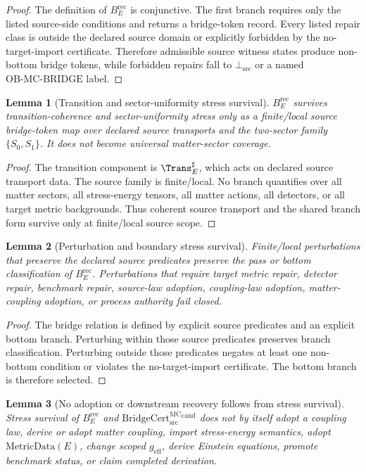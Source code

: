 \documentclass[11pt]{article}
\newcommand{\geff}{g_{\mathrm{eff}}}
\newcommand{\MetricData}{\mathrm{MetricData}}
\newcommand{\BridgeCert}{\mathrm{BridgeCert}_{\mathrm{src}}^{\mathrm{MC}}}
\newcommand{\BottomSrc}{\bot_{\mathrm{src}}}
\newcommand{\OBMCB}{\mathrm{OB}\mbox{-}\mathrm{MC}\mbox{-}\mathrm{BRIDGE}}
\newcommand{\BErec}{B_E^{\mathrm{rec}}}
\newtheorem{lemma}{Lemma}
\begin{document}
\begin{proof}
The definition of \(\BErec\) is conjunctive. The first branch requires only
the listed source-side conditions and returns a bridge-token record. Every
listed repair class is outside the declared source domain or explicitly
forbidden by the no-target-import certificate. Therefore admissible source
witness states produce non-bottom bridge tokens, while forbidden repairs fall
to \(\BottomSrc\) or a named \(\OBMCB\) label.
\end{proof}

\begin{lemma}[Transition and sector-uniformity stress survival]
\(\BErec\) survives transition-coherence and sector-uniformity stress only as
a finite/local source bridge-token map over declared source transports and the
two-sector family \(\{S_0,S_1\}\). It does not become universal matter-sector
coverage.
\end{lemma}

\begin{proof}
The transition component is \(\Trans_E^\sharp\), which acts on declared source
transport data. The source family is finite/local. No branch quantifies over
all matter sectors, all stress-energy tensors, all matter actions, all
detectors, or all target metric backgrounds. Thus coherent source transport
and the shared branch form survive only at finite/local source scope.
\end{proof}

\begin{lemma}[Perturbation and boundary stress survival]
Finite/local perturbations that preserve the declared source predicates
preserve the pass or bottom classification of \(\BErec\). Perturbations that
require target metric repair, detector repair, benchmark repair, source-law
adoption, coupling-law adoption, matter-coupling adoption, or process
authority fail closed.
\end{lemma}

\begin{proof}
The bridge relation is defined by explicit source predicates and an explicit
bottom branch. Perturbing within those source predicates preserves branch
classification. Perturbing outside those predicates negates at least one
non-bottom condition or violates the no-target-import certificate. The bottom
branch is therefore selected.
\end{proof}

\begin{lemma}[No adoption or downstream recovery follows from stress survival]
Stress survival of \(\BErec\) and \(\BridgeCert^{\mathrm{cand}}\) does not by
itself adopt a coupling law, derive or adopt matter coupling, import
stress-energy semantics, adopt \(\MetricData(E)\), change scoped \(\geff\),
derive Einstein equations, promote benchmark status, or claim completed
derivation.
\end{lemma}
\end{document}
